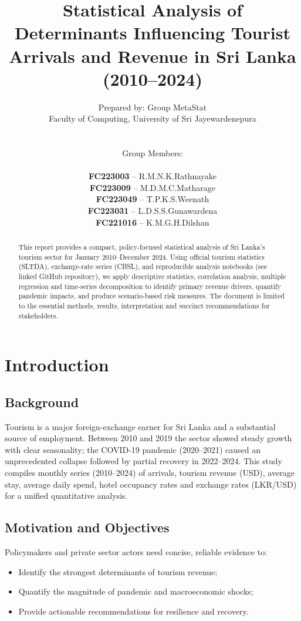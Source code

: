 \documentclass[12pt,a4paper]{article}
\title{\LARGE \textbf{Statistical Analysis of Determinants Influencing Tourist Arrivals and Revenue in Sri Lanka (2010--2024)}}
\author{Prepared by: Group MetaStat \\ Faculty of Computing, University of Sri Jayewardenepura 
\\\\\\Group Members: \\\\
    \textbf{FC223003} -- R.M.N.K.Rathnayake \\
    \textbf{FC223009} -- M.D.M.C.Matharage \\
    \textbf{FC223049} -- T.P.K.S.Weenath \\
    \textbf{FC223031} -- L.D.S.S.Gunawardena \\
    \textbf{FC221016} -- K.M.G.H.Dilshan \\}
\begin{document}
\maketitle

\newpage

\begin{abstract}
This report provides a compact, policy-focused statistical analysis of Sri Lanka's tourism sector for January 2010--December 2024. Using official tourism statistics (SLTDA), exchange-rate series (CBSL), and reproducible analysis notebooks (see linked GitHub repository), we apply descriptive statistics, correlation analysis, multiple regression and time-series decomposition to identify primary revenue drivers, quantify pandemic impacts, and produce scenario-based risk measures. The document is limited to the essential methods, results, interpretation and succinct recommendations for stakeholders.
\end{abstract}

\newpage
\tableofcontents
\newpage

\section{Introduction}
\subsection{Background}
Tourism is a major foreign-exchange earner for Sri Lanka and a substantial source of employment. Between 2010 and 2019 the sector showed steady growth with clear seasonality; the COVID-19 pandemic (2020--2021) caused an unprecedented collapse followed by partial recovery in 2022--2024. This study compiles monthly series (2010--2024) of arrivals, tourism revenue (USD), average stay, average daily spend, hotel occupancy rates and exchange rates (LKR/USD) for a unified quantitative analysis.

\subsection{Motivation and Objectives}
Policymakers and private sector actors need concise, reliable evidence to:
\begin{itemize}
  \item Identify the strongest determinants of tourism revenue;
  \item Quantify the magnitude of pandemic and macroeconomic shocks;
  \item Provide actionable recommendations for resilience and recovery.
\end{itemize}
\end{document}
